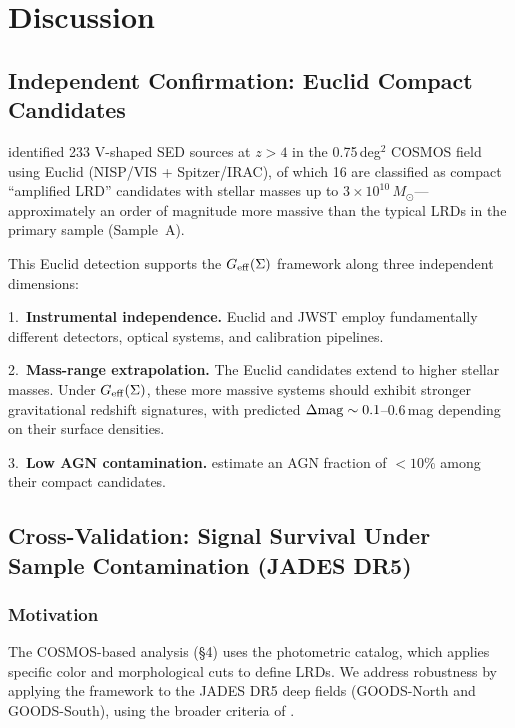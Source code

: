 \documentclass[apj,twocolumn,longbibliography,linenumbers]{aastex701}
\begin{document}

\section{Discussion}

\subsection{Independent Confirmation: Euclid Compact Candidates}

\citealt{Tumborang2026} identified 233 V-shaped SED sources at $z > 4$ in the 0.75\,deg$^2$ COSMOS field using Euclid (NISP/VIS + Spitzer/IRAC), of which 16 are classified as compact ``amplified LRD'' candidates with stellar masses up to $3 \times 10^{10}\,M_\odot$---approximately an order of magnitude more massive than the typical LRDs in the primary sample (Sample~A).

This Euclid detection supports the $G_{\rm eff}(\Sigma)$ framework along three independent dimensions:

1.~\textbf{Instrumental independence.} Euclid and JWST employ fundamentally different detectors, optical systems, and calibration pipelines.

2.~\textbf{Mass-range extrapolation.} The Euclid candidates extend to higher stellar masses. Under $G_{\rm eff}(\Sigma)$, these more massive systems should exhibit stronger gravitational redshift signatures, with predicted $\Delta{\rm mag} \sim 0.1$--$0.6$\,mag depending on their surface densities.

3.~\textbf{Low AGN contamination.} \citealt{Tumborang2026} estimate an AGN fraction of $< 10\%$ among their compact candidates.

\subsection{Cross-Validation: Signal Survival Under Sample Contamination (JADES DR5)}

\subsubsection{Motivation}

The COSMOS-based analysis (\S4) uses the \citealt{Kokorev2024} photometric catalog, which applies specific color and morphological cuts to define LRDs. We address robustness by applying the framework to the JADES DR5 deep fields (GOODS-North and GOODS-South), using the broader criteria of \citealt{Rinaldi2026}.
\end{document}
